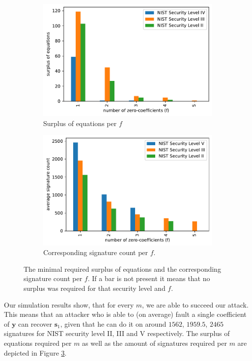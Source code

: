 \begin{figure}%
	\centering%
	\begin{subfigure}{.5\textwidth}%
		\centering%
		\includegraphics[width=.95\linewidth]{plots/dilithium_surplus}%
		\caption{Surplus of equations per $f$}%
		\label{fig:dilithiumsurplus}%
	\end{subfigure}%
	\begin{subfigure}{.5\textwidth}%
		\centering%
		\includegraphics[width=.95\linewidth]{plots/dilithium_sigcount_upper}%
		\caption{Corresponding signature count per $f$.}%
		\label{fig:dilithiumsigcountsurplus}%
	\end{subfigure}%
%
	\caption{The minimal required surplus of equations and the corresponding signature count per $f$. If a bar is not present it means that no surplus was required for that security level and $f$.}
	\label{fig:dilithiumsigcountsurplussurplus}%
\end{figure}

Our simulation results show, that for every $m$, we are able to succeed our attack.
This means that an attacker who is able to (on average) fault a single coefficient of $\bm{y}$ can recover $\bm{s}_{1}$, given that he can do it on around $1562$,  $1959.5$, $2465$ signatures for NIST security level II, III and V respectively. The surplus of equations required per $m$ as well as the amount of signatures required per $m$ are depicted in Figure \ref{fig:dilithiumsigcountsurplussurplus}.

